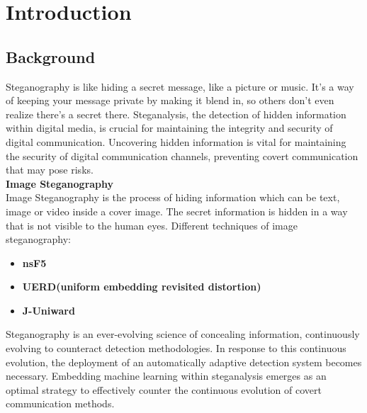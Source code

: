 \chapter{Introduction}
\section{Background}
Steganography is like hiding a secret message, like a picture or music. It's a way of keeping your message private by making it blend in, so others don't even realize there's a secret there. Steganalysis, the detection of hidden information within digital media, is crucial for maintaining the integrity and security of digital communication. Uncovering hidden information is vital for maintaining the security of digital communication channels, preventing covert communication that may pose risks.\vspace{0.5cm}\\
\textbf{Image Steganography}\\
Image Steganography is the process of hiding information which can be text, image or video inside a cover image. The secret information is hidden in a way that is not visible to the human eyes.
Different techniques of image steganography:
\begin{itemize}[noitemsep]
\item \textbf{nsF5}
\item \textbf{UERD(uniform embedding revisited distortion)}
\item \textbf{J-Uniward}\\
\end{itemize}
Steganography is an ever-evolving science of concealing information, continuously evolving to counteract detection methodologies. In response to this continuous evolution, the deployment of an automatically adaptive detection system becomes necessary. Embedding machine learning within steganalysis emerges as an optimal strategy to effectively counter the continuous evolution of covert communication methods.\\
\clearpage
